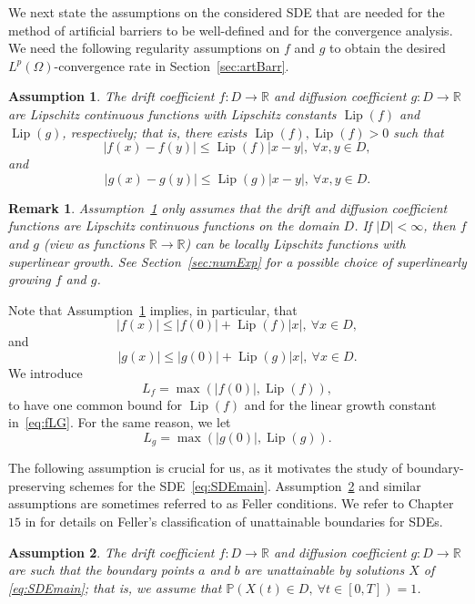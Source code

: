 \documentclass[11pt]{amsart}
\newtheorem{remark}[theorem]{Remark}
\newtheorem{assumption}{Assumption}
\newcommand{\PP}{{\mathbb P}}
\newcommand{\Lip}{\operatorname{Lip}}
\begin{document}
{We next state the assumptions on the considered SDE that are needed for the method of artificial barriers to be well-defined and for the convergence analysis. We need the following regularity assumptions on $f$ and $g$ to obtain the desired $L^{p}(\Omega)$-convergence rate in Section~\ref{sec:artBarr}.

\begin{assumption}\label{ass:Lip}
The drift coefficient $f: D \to \mathbb{R}$ and diffusion coefficient $g: D \to \mathbb{R}$ are Lipschitz continuous functions with Lipschitz constants $\Lip(f)$ and $\Lip(g)$, respectively; that is, there exists $\Lip(f), \Lip(f)>0$ such that
\begin{equation*}
|f(x) - f(y)| \leq \Lip(f) |x-y|,\ \forall x,y \in D,
\end{equation*}
and 
\begin{equation*}
|g(x) - g(y)| \leq \Lip(g) |x-y|,\ \forall x,y \in D.
\end{equation*}
\end{assumption}
\begin{remark}
Assumption~\ref{ass:Lip} only assumes that the drift and diffusion coefficient functions are Lipschitz continuous functions on the domain $D$. If $|D| < \infty$, then $f$ and $g$ (view as functions $\mathbb{R} \to \mathbb{R}$) can be locally Lipschitz functions with superlinear growth. See Section~\ref{sec:numExp} for a possible choice of superlinearly growing $f$ and $g$.
\end{remark}
Note that Assumption~\ref{ass:Lip} implies, in particular, that
\begin{equation}\label{eq:fLG}
|f(x)| \leq |f(0)| + \Lip(f) |x|,\ \forall x \in D,
\end{equation}
and
\begin{equation}\label{eq:gLG}
|g(x)| \leq |g(0)| + \Lip(g) |x|,\ \forall x \in D.
\end{equation}
We introduce
\begin{equation*}
L_{f} = \max \left( |f(0)|, \Lip(f) \right),
\end{equation*}
to have one common bound for $\Lip(f)$ and for the linear growth constant in~\eqref{eq:fLG}. For the same reason, we let
\begin{equation*}
L_{g} = \max \left( |g(0)|, \Lip(g) \right).
\end{equation*}
 

The following assumption is crucial for us, as it motivates the study of boundary-preserving schemes for the SDE~\eqref{eq:SDEmain}. Assumption~\ref{ass:Feller} and similar assumptions are sometimes referred to as Feller conditions. We refer to Chapter $15$ in \cite{Karlin1981ASC} for details on Feller's classification of unattainable boundaries for SDEs.
\begin{assumption}\label{ass:Feller}
The drift coefficient $f: D \to \mathbb{R}$ and diffusion coefficient $g: D \to \mathbb{R}$ are such that the boundary points $a$ and $b$ are unattainable by solutions $X$ of \eqref{eq:SDEmain}; that is, we assume that $\PP (X(t) \in D,\ \forall t \in [0,T]) = 1$.
\end{assumption}

}
\end{document}
